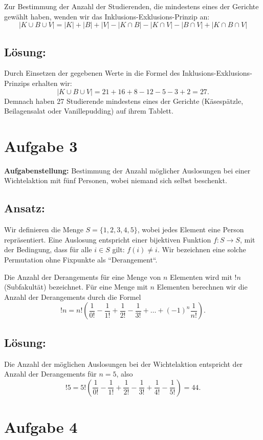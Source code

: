 \documentclass{article}
\begin{document}
Zur Bestimmung der Anzahl der Studierenden, die mindestens eines der Gerichte gewählt haben, wenden wir das Inklusions-Exklusions-Prinzip an:
\[ |K \cup B \cup V| = |K| + |B| + |V| - |K \cap B| - |K \cap V| - |B \cap V| + |K \cap B \cap V| \]

\subsection*{Lösung:}
Durch Einsetzen der gegebenen Werte in die Formel des Inklusions-Exklusions-Prinzips erhalten wir:
\[ |K \cup B \cup V| = 21 + 16 + 8 - 12 - 5 - 3 + 2 = 27. \]
Demnach haben 27 Studierende mindestens eines der Gerichte (Käsespätzle, Beilagensalat oder Vanillepudding) auf ihrem Tablett.

\section*{Aufgabe 3}

\textbf{Aufgabenstellung:} Bestimmung der Anzahl möglicher Auslosungen bei einer Wichtelaktion mit fünf Personen, wobei niemand sich selbst beschenkt.

\subsection*{Ansatz:}
Wir definieren die Menge \( S = \{1, 2, 3, 4, 5\} \), wobei jedes Element eine Person repräsentiert. Eine Auslosung entspricht einer bijektiven Funktion \( f: S \to S \), mit der Bedingung, dass für alle \( i \in S \) gilt: \( f(i) \neq i \). Wir bezeichnen eine solche Permutation ohne Fixpunkte als ``Derangement``.

Die Anzahl der Derangements für eine Menge von \( n \) Elementen wird mit \( !n \) (Subfakultät) bezeichnet. Für eine Menge mit \( n \) Elementen berechnen wir die Anzahl der Derangements durch die Formel
\[ !n = n! \left( \frac{1}{0!} - \frac{1}{1!} + \frac{1}{2!} - \frac{1}{3!} + \ldots + (-1)^n \frac{1}{n!} \right). \]

\subsection*{Lösung:}
Die Anzahl der möglichen Auslosungen bei der Wichtelaktion entspricht der Anzahl der Derangements für \( n = 5 \), also
\[ !5 = 5! \left( \frac{1}{0!} - \frac{1}{1!} + \frac{1}{2!} - \frac{1}{3!} + \frac{1}{4!} - \frac{1}{5!} \right) = 44. \]

\section*{Aufgabe 4}
\end{document}
